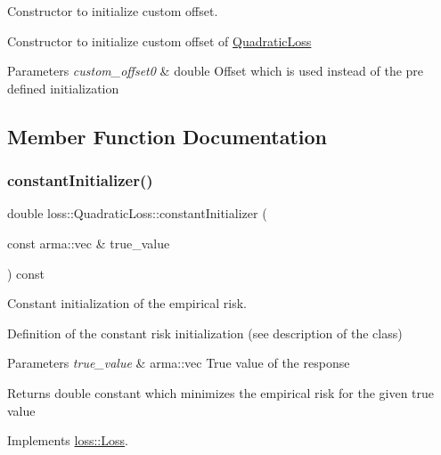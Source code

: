 Constructor to initialize custom offset. 

Constructor to initialize custom offset of {\ttfamily \hyperlink{classloss_1_1_quadratic_loss}{Quadratic\+Loss}}


\begin{DoxyParams}{Parameters}
{\em custom\+\_\+offset0} & {\ttfamily double} Offset which is used instead of the pre defined initialization \\
\hline
\end{DoxyParams}


\subsection{Member Function Documentation}
\mbox{\label{classloss_1_1_quadratic_loss_a43989f3fbecc27351513afe1136cdf38}} 
\subsubsection{\texorpdfstring{constant\+Initializer()}{constantInitializer()}}
{\footnotesize\ttfamily double loss\+::\+Quadratic\+Loss\+::constant\+Initializer (\begin{DoxyParamCaption}\item[{const arma\+::vec \&}]{true\+\_\+value }\end{DoxyParamCaption}) const\hspace{0.3cm}{\ttfamily [virtual]}}



Constant initialization of the empirical risk. 

Definition of the constant risk initialization (see description of the class)


\begin{DoxyParams}{Parameters}
{\em true\+\_\+value} & {\ttfamily arma\+::vec} True value of the response\\
\hline
\end{DoxyParams}
\begin{DoxyReturn}{Returns}
{\ttfamily double} constant which minimizes the empirical risk for the given true value 
\end{DoxyReturn}


Implements \hyperlink{classloss_1_1_loss_a65fe7dcd9370e6a549b8d1cc95fc8798}{loss\+::\+Loss}.

